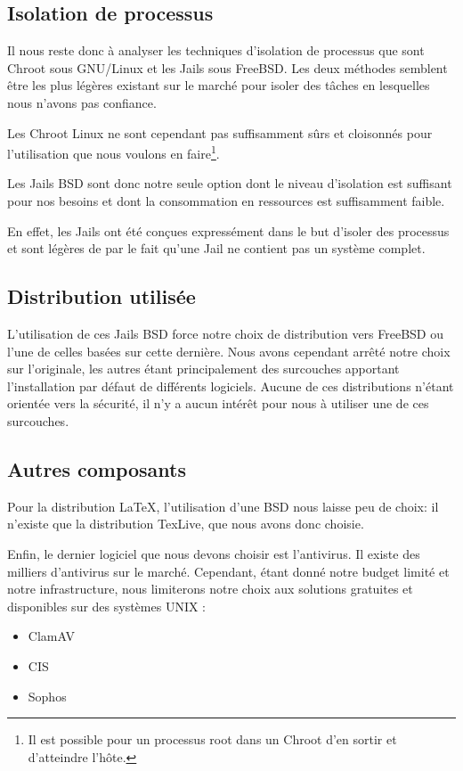 \documentclass[10pt,a4paper]{article}
\begin{document}
\subsection{Isolation de processus}

Il nous reste donc à analyser les techniques d'isolation de processus que sont Chroot sous GNU/Linux et les Jails sous FreeBSD.
Les deux méthodes semblent être les plus légères existant sur le marché pour isoler des tâches en lesquelles nous n'avons pas confiance.

Les Chroot Linux ne sont cependant pas suffisamment sûrs et cloisonnés pour l'utilisation que nous voulons en faire\footnote{Il est possible pour un processus root dans un Chroot d'en sortir et d'atteindre l'hôte.}.

Les Jails BSD sont donc notre seule option dont le niveau d'isolation est suffisant pour nos besoins et dont la consommation en ressources est suffisamment faible.

En effet, les Jails ont été conçues expressément dans le but d'isoler des processus et sont légères de par le fait qu'une Jail ne contient pas un système complet.

\subsection{Distribution utilisée}

L'utilisation de ces Jails BSD force notre choix de distribution vers FreeBSD ou l'une de celles basées sur cette dernière. Nous avons cependant arrêté notre choix sur l'originale, les autres étant principalement des surcouches apportant l'installation par défaut de différents logiciels. Aucune de ces distributions n'étant orientée vers la sécurité, il n'y a aucun intérêt pour nous à utiliser une de ces surcouches.

\subsection{Autres composants}
\label{jail}

Pour la distribution \LaTeX, l'utilisation d'une BSD nous laisse peu de choix: il n'existe que la distribution TexLive, que nous avons donc choisie.

Enfin, le dernier logiciel que nous devons choisir est l'antivirus. Il existe des milliers d'antivirus sur le marché. Cependant, étant donné notre budget limité et notre infrastructure, nous limiterons notre choix aux solutions gratuites et disponibles sur des systèmes UNIX :
\begin{itemize}
    \item{ClamAV}
    \item{CIS}
    \item{Sophos}
\end{itemize}
\end{document}
